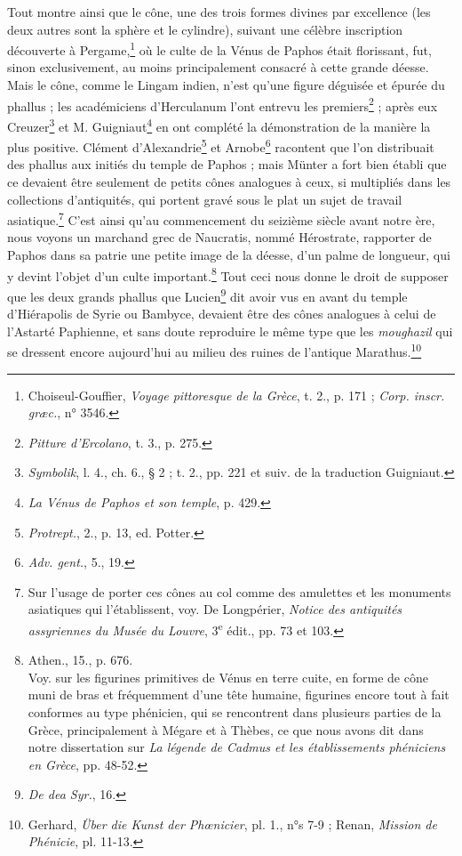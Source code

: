 \documentclass[a4paper, 11pt, oneside, landscape]{article}
\begin{document}
Tout montre ainsi que le cône, une des trois formes divines par excellence (les deux autres sont la sphère et le cylindre), suivant une célèbre inscription découverte à Pergame,\footnote{Choiseul-Gouffier, \emph{Voyage pittoresque de la Grèce}, t. 2., p. 171 ; \emph{Corp. inscr. græc.}, n° 3546.} où le culte de la Vénus de Paphos était florissant, fut, sinon exclusivement, au moins principalement consacré à cette grande déesse. Mais le cône, comme le Lingam indien, n'est qu'une figure déguisée et épurée du phallus ; les académiciens d'Herculanum l'ont entrevu les premiers\footnote{\emph{Pitture d'Ercolano}, t. 3., p. 275.} ; après eux Creuzer\footnote{\emph{Symbolik}, l. 4., ch. 6., § 2 ; t. 2., pp. 221 et suiv. de la traduction Guigniaut.} et M. Guigniaut\footnote{\emph{La Vénus de Paphos et son temple}, p. 429.} en ont complété la démonstration de la manière la plus positive. Clément d'Alexandrie\footnote{\emph{Protrept.}, 2., p. 13, ed. Potter.} et Arnobe\footnote{\emph{Adv. gent.}, 5., 19.} racontent que l'on distribuait des phallus aux initiés du temple de Paphos ; mais Münter a fort bien établi que ce devaient être seulement de petits cônes analogues à ceux, si multipliés dans les collections d'antiquités, qui portent gravé sous le plat un sujet de travail asiatique.\footnote{Sur l'usage de porter ces cônes au col comme des amulettes et les monuments asiatiques qui l'établissent, voy. De Longpérier, \emph{Notice des antiquités assyriennes du Musée du Louvre}, 3\textsuperscript{e} édit., pp. 73 et 103.} C'est ainsi qu'au commencement du seizième siècle avant notre ère, nous voyons un marchand grec de Naucratis, nommé Hérostrate, rapporter de Paphos dans sa patrie une petite image de la déesse, d'un palme de longueur, qui y devint l'objet d'un culte important.\footnote{Athen., 15., p. 676.\\\hspace*{5mm}Voy. sur les figurines primitives de Vénus en terre cuite, en forme de cône muni de bras et fréquemment d'une tête humaine, figurines encore tout à fait conformes au type phénicien, qui se rencontrent dans plusieurs parties de la Grèce, principalement à Mégare et à Thèbes, ce que nous avons dit dans notre dissertation sur \emph{La légende de Cadmus et les établissements phéniciens en Grèce}, pp. 48-52.} Tout ceci nous donne le droit de supposer que les deux grands phallus que Lucien\footnote{\emph{De dea Syr.}, 16.} dit avoir vus en avant du temple d'Hiérapolis de Syrie ou Bambyce, devaient être des cônes analogues à celui de l'Astarté Paphienne, et sans doute reproduire le même type que les \emph{moughazil} qui se dressent encore aujourd'hui au milieu des ruines de l'antique Marathus.\footnote{Gerhard, \emph{Über die Kunst der Phœnicier}, pl. 1., n°s 7-9 ; Renan, \emph{Mission de Phénicie}, pl. 11-13.}
\end{document}
